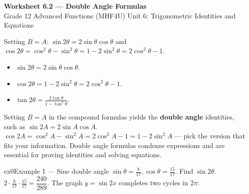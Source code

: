 \documentclass[11pt]{article}
\begin{document}
\begin{center}
{\LARGE\bfseries\color{titleblue}Worksheet 6.2 --- Double Angle Formulas}\\[2pt]
{\small Grade 12 Advanced Functions (MHF4U) \textperiodcentered{} Unit 6: Trigonometric Identities and Equations}
\end{center}

\begin{ideabox}
Setting $B=A$: $\sin2\theta=2\sin\theta\cos\theta$ and $\cos2\theta=\cos^2\theta-\sin^2\theta=1-2\sin^2\theta=2\cos^2\theta-1$.
\begin{itemize}[leftmargin=*,itemsep=2pt]
  \item $\sin2\theta=2\sin\theta\cos\theta$.
  \item $\cos2\theta=1-2\sin^2\theta=2\cos^2\theta-1$.
  \item $\tan2\theta=\tfrac{2\tan\theta}{1-\tan^2\theta}$.
\end{itemize}
\end{ideabox}

\begin{learnbox}
Setting $B=A$ in the compound formulas yields the \textbf{double angle} identities, such as $\sin2A=2\sin A\cos A$.
$\cos2A=\cos^2A-\sin^2A=2\cos^2A-1=1-2\sin^2A$ — pick the version that fits your information.
Double angle formulas condense expressions and are essential for proving identities and solving equations.
\end{learnbox}


\begin{example}{ex0}{Example 1 --- Sine double angle}
$\sin\theta=\tfrac8{17},\cos\theta=\tfrac{15}{17}$. Find $\sin2\theta$.\soln $2\cdot\tfrac8{17}\cdot\tfrac{15}{17}=\dfrac{240}{289}$. The graph $y=\sin2x$ completes two cycles in $2\pi$:\begin{center}\end{center}
\end{example}
\end{document}
